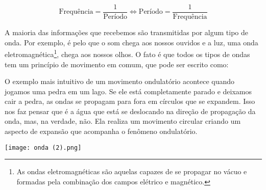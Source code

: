 \documentclass[book, 12pt, twoside, a5paper, english, brazil, sumario=tradicional, openany]{abntex2}
\begin{document}
\begin{equation}
    \text{Frequência} = \dfrac{1}{\text{Período}} \iff \text{Período} = \dfrac{1}{\text{Frequência}}
\end{equation}

\vspace{-0.9cm}

{}

\vspace{-0.3cm}

A maioria das informações que recebemos são transmitidas por algum tipo de onda. Por exemplo, é pelo {\color{celestialblue}{movimento ondulatório}} que o som chega aos nossos ouvidos e a luz, uma onda eletromagnética\footnote{As ondas eletromagnéticas são aquelas capazes de se propagar no vácuo e formadas pela combinação dos campos elétrico e magnético.}, chega aos nossos olhos. O fato é que todos os tipos de ondas tem um princípio de movimento em comum, que pode ser escrito como:

\vspace{0.5cm}

\begin{center}
\begin{tcolorbox}[colback=white!91!brown, width = 0.8\linewidth , colframe = celestialblue, title=\centering{\color{white}{\textsc{Princípio da energia das ondas}}}]
\vspace{0cm}

{}

\end{tcolorbox}
\end{center}

\vspace{-0.1cm}

O exemplo mais intuitivo de um movimento ondulatório acontece quando jogamos uma pedra em um lago. Se ele está completamente parado e deixamos cair a pedra, as ondas se propagam para fora em círculos que se expandem. Isso nos faz pensar que é a água que está se deslocando na direção de propagação da onda, mas, na verdade, não. Ela realiza um movimento circular criando um aspecto de expansão que acompanha o fenômeno ondulatório.

\vspace{-3cm}
\begin{center}
    \texttt{[image: onda (2).png]} 
\end{center}
\vspace{-3.5cm}
\end{document}
